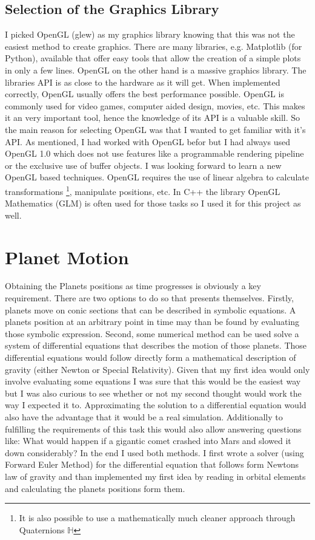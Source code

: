 \documentclass[a4paper,onesided,10pt]{article}
\begin{document}
\subsection{Selection of the Graphics Library}
I picked OpenGL (glew) as my graphics library knowing that this was not the easiest method to create graphics. There are many libraries, e.g. Matplotlib (for Python), available that offer easy tools that allow the creation of a simple plots in only a few lines. OpenGL on the other hand is a massive graphics library. The libraries API is as close to the hardware as it will get. When implemented correctly, OpenGL usually offers the best performance possible. OpenGL is commonly used for video games, computer aided design, movies, etc. This makes it an very important tool, hence the knowledge of its API is a valuable skill. So the main reason for selecting OpenGL was that I wanted to get familiar with it's API. As mentioned, I had worked with OpenGL befor but I had always used OpenGL 1.0 which does not use features like a programmable rendering pipeline or the exclusive use of buffer objects. I was looking forward to learn a new OpenGL based techniques. OpenGL requires the use of linear algebra to calculate transformations \footnote{It is also possible to use a mathematically much cleaner approach through Quaternions $\mathbb{H}$ }, manipulate positions, etc. In C++ the library OpenGL Mathematics (GLM) is often used for those tasks so I used it for this project as well.


\section{Planet Motion}
Obtaining the Planets positions as time progresses is obviously a key requirement. There are two options to do so that presents themselves. Firstly, planets move on conic sections that can be described in symbolic equations. A planets position at an arbitrary point in time may than be found by evaluating those symbolic expression. Second, some numerical method can be used solve a system of differential equations that describes the motion of those planets. Those differential equations would follow directly form a mathematical description of gravity (either Newton or Special Relativity). Given that my first idea would only involve evaluating some equations I was sure that this would be the easiest way but I was also curious to see whether or not my second thought would work the way I expected it to. Approximating the solution to a differential equation would also have the advantage that it would be a real simulation. Additionally to fulfilling the requirements of this task this would also allow answering questions like: What would happen if a gigantic comet crashed into Mars and slowed it down considerably? In the end I used both methods. I first wrote a solver (using Forward Euler Method) for the differential equation that follows form Newtons law of gravity and than implemented my first idea by reading in orbital elements and calculating the planets positions form them.
\end{document}
